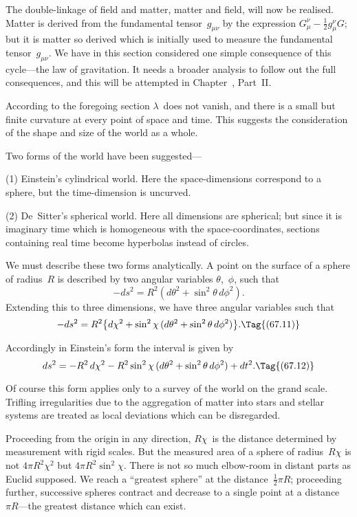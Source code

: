 \documentclass[12pt]{book}
\begin{document}
The double\hyp{}linkage of field and matter, matter and field, will now be
realised. Matter is derived from the fundamental tensor~$g_{\mu\nu}$ by the expression
$G_{\mu}^{\nu} - \tfrac{1}{2}g_{\mu}^{\nu}G$; but it is matter so derived which is initially used to measure
the fundamental tensor~$g_{\mu\nu}$. We have in this section considered one simple
consequence of this cycle---the law of gravitation. It needs a broader analysis
to follow out the full consequences, and this will be attempted in Chapter~,
Part~II\@.


According to the foregoing section $\lambda$~does not vanish, and there is a
small but finite curvature at every point of space and time. This suggests
the consideration of the shape and size of the world as a whole.
%

Two forms of the world have been suggested---

(1) Einstein's cylindrical world. Here the space\hyp{}dimensions correspond
%
%
to a sphere, but the time\hyp{}dimension is uncurved.

(2) De~Sitter's spherical world. Here all dimensions are spherical; but
%
%
%
since it is imaginary time which is homogeneous with the space\hyp{}coordinates,
sections containing real time become hyperbolas instead of circles.

We must describe these two forms analytically. A point on the surface of
a sphere of radius~$R$ is described by two angular variables $\theta$,~$\phi$, such that
\[
-ds^{2} = R^{2}(d\theta^2 + \sin^{2}\theta\, d\phi^{2}).
\]
Extending this to three dimensions, we have three angular variables such that
\[
-ds^{2} = R^{2}\bigl\{d\chi^{2} + \sin^{2}\chi\, (d\theta^2 + \sin^{2}\theta\, d\phi^{2})\bigr\}.
\Tag{(67.11)}
\]

Accordingly in Einstein's form the interval is given by
\[
ds^{2} = -R^{2}\, d\chi^{2} - R^{2} \sin^{2}\chi\, (d\theta^2 + \sin^{2}\theta\, d\phi^{2}) + dt^{2}.
\Tag{(67.12)}
\]

Of course this form applies only to a survey of the world on the grand
scale. Trifling irregularities due to the aggregation of matter into stars and
stellar systems are treated as local deviations which can be disregarded.

Proceeding from the origin in any direction, $R\chi$~is the distance determined
%
by measurement with rigid scales. But the measured area of a sphere of radius~$R\chi$
is not $4\pi R^{2}\chi^{2}$ but $4\pi R^{2} \sin^{2}\chi$. There is not so much elbow\hyp{}room in distant
parts as Euclid supposed. We reach a ``greatest sphere'' at the distance~$\frac{1}{2}\pi R$;
proceeding further, successive spheres contract and decrease to a single point
at a distance~$\pi R$---the greatest distance which can exist.
\end{document}
